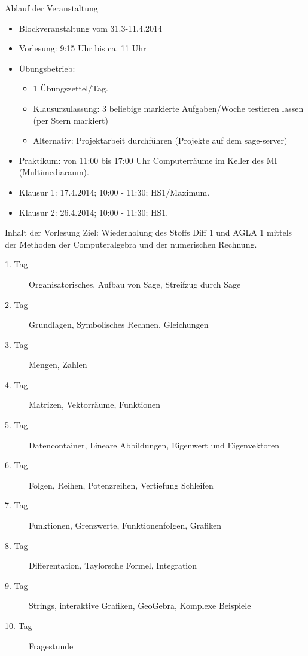 \documentclass[hyperref={xetex}]{beamer}
\begin{document}
\begin{frame}{Ablauf der Veranstaltung}
\begin{itemize}
\item Blockveranstaltung vom  31.3-11.4.2014
\item \alert{Vorlesung:} 9:15 Uhr bis ca. 11 Uhr
\item \alert{Übungsbetrieb:}
\begin{itemize}
\item 1 Übungszettel/Tag.
\item Klausurzulassung: 3 beliebige markierte Aufgaben/Woche testieren lassen (per Stern markiert)
\item Alternativ: Projektarbeit durchführen (Projekte auf dem sage-server)
\end{itemize}
\item \alert{Praktikum:} von 11:00 bis 17:00 Uhr Computerräume im Keller des MI (Multimediaraum).
\item \alert{Klausur 1:} 17.4.2014; 10:00 - 11:30; HS1/Maximum.
\item \alert{Klausur 2:} 26.4.2014; 10:00 - 11:30; HS1.
\end{itemize}
\end{frame}

\begin{frame}{Inhalt der Vorlesung}
\alert{Ziel:} Wiederholung des Stoffs Diff 1 und AGLA 1 mittels der Methoden der Computeralgebra und der numerischen Rechnung.
\begin{description}
 \item[1. Tag] Organisatorisches, Aufbau von Sage, Streifzug durch Sage
\item [2. Tag] Grundlagen, Symbolisches Rechnen, Gleichungen
\item [3. Tag] Mengen, Zahlen
\item [4. Tag] Matrizen, Vektorräume, Funktionen
\item [5. Tag] Datencontainer, Lineare Abbildungen, Eigenwert und Eigenvektoren
\item [6. Tag] Folgen, Reihen, Potenzreihen, Vertiefung Schleifen
\item [7. Tag] Funktionen, Grenzwerte, Funktionenfolgen, Grafiken
\item [8. Tag] Differentation, Taylorsche Formel, Integration
\item [9. Tag] Strings, interaktive Grafiken, GeoGebra, Komplexe Beispiele
\item [10. Tag] Fragestunde
\end{description}
\end{frame}
\end{document}
